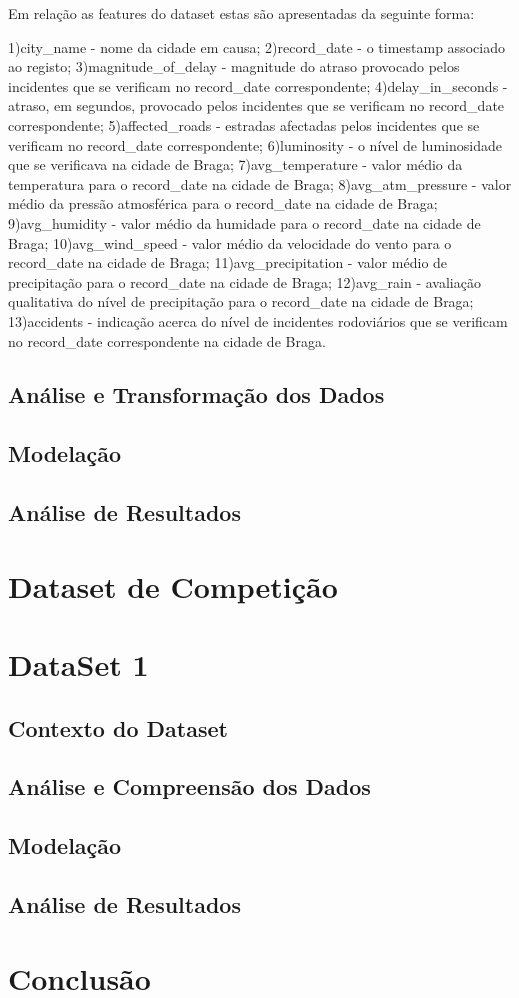 \documentclass[a4paper,10pt]{article}
\begin{document}
Em relação as features do dataset estas são apresentadas da seguinte forma:

1)city_name - nome da cidade em causa;
2)record_date - o timestamp associado ao registo;
3)magnitude_of_delay - magnitude do atraso provocado pelos incidentes que se verificam no record_date correspondente;
4)delay_in_seconds - atraso, em segundos, provocado pelos incidentes que se verificam no record_date correspondente;
5)affected_roads - estradas afectadas pelos incidentes que se verificam no record_date correspondente;
6)luminosity - o nível de luminosidade que se verificava na cidade de Braga;
7)avg_temperature - valor médio da temperatura para o record_date na cidade de Braga;
8)avg_atm_pressure - valor médio da pressão atmosférica para o record_date na cidade de Braga;
9)avg_humidity - valor médio da humidade para o record_date na cidade de Braga;
10)avg_wind_speed - valor médio da velocidade do vento para o record_date na cidade de Braga;
11)avg_precipitation - valor médio de precipitação para o record_date na cidade de Braga;
12)avg_rain - avaliação qualitativa do nível de precipitação para o record_date na cidade de Braga;
13)accidents - indicação acerca do nível de incidentes rodoviários que se verificam no record_date correspondente na cidade de Braga.

 
\subsection{Análise e Transformação dos Dados}

\subsection{Modelação}
\subsection{Análise de Resultados}
\section{Dataset de Competição}


\newpage
\section{DataSet 1}
\subsection{Contexto do Dataset}
\subsection{Análise e Compreensão dos Dados}
\subsection{Modelação}
\subsection{Análise de Resultados}
\section{Conclusão}
\end{document}
